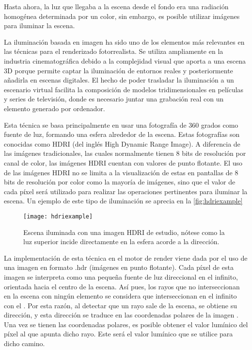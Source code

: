 Hasta ahora, la luz que llegaba a la escena desde el fondo era una radiación homogénea determinada por un color, sin embargo, es posible utilizar imágenes para iluminar la escena.
	
La iluminación basada en imagen ha sido uno de los elementos más relevantes en las técnicas para el renderizado fotorrealista. Se utiliza ampliamente en la industria cinematográfica debido a la complejidad visual que aporta a una escena 3D porque permite captar la iluminación de entornos reales y posteriormente añadirla en escenas digitales. El hecho de poder trasladar la iluminación a un escenario virtual facilita la composición de modelos tridimensionales en películas y series de televisión, donde es necesario juntar una grabación real con un elemento generado por ordenador.

Esta técnica se basa principalmente en usar una fotografía de 360 grados como fuente de luz, formando una esfera alrededor de la escena. Estas fotografías son conocidas como HDRI (del inglés High Dynamic Range Image). A diferencia de las imágenes tradicionales, las cuales normalmente tienen 8 bits de resolución por canal de color, las imágenes HDRI cuentan con valores de punto flotante. El uso de las imágenes HDRI no se limita a la visualización de estas en pantallas de 8 bits de resolución por color como la mayoría de imágenes, sino que el valor de cada píxel será utilizado para realizar las operaciones pertinentes para iluminar la escena. Un ejemplo de este tipo de iluminación se aprecia en la \autoref{fig:hdriexample}

		
\begin{figure}[H]
	\label{fig:hdriexample}
    \centering
	\texttt{[image: hdriexample]}
	\caption{Escena iluminada con una imagen HDRI de estudio, nótese como la luz superior incide directamente en la esfera acorde a la dirección.}
\end{figure}

La implementación de esta técnica en el motor de render viene dada por el uso de una imagen en formato .hdr (imágenes en punto flotante). Cada píxel de esta imagen se interpreta como una pequeña fuente de luz direccional en el infinito, orientada hacia el centro de la escena. Así pues, los rayos que no interseccionan en la escena con ningún elemento se considera que interseccionan en el infinito con el . Por esta razón, al detectar que un rayo sale de la escena, se obtiene su dirección, y esta dirección se traduce en las coordenadas polares de la imagen . Una vez se tienen las coordenadas polares, es posible obtener el valor lumínico del píxel al que apunta dicho rayo. Este será el valor lumínico que se utilice para dicho camino.
	

